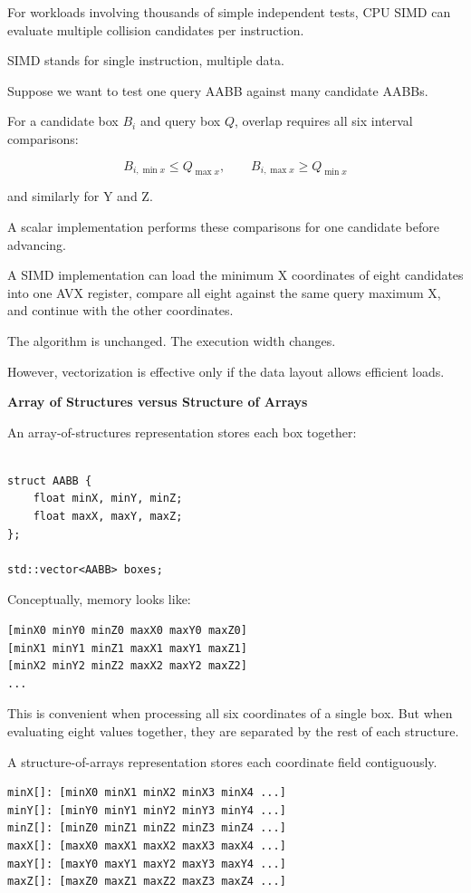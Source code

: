 For workloads involving thousands of simple independent tests, CPU SIMD can evaluate multiple collision candidates per instruction.

SIMD stands for single instruction, multiple data.

Suppose we want to test one query AABB against many candidate AABBs.

For a candidate box \(B_i\) and query box \(Q\), overlap requires all six interval comparisons:

\[
B_{i,\min x}\le Q_{\max x}, \qquad B_{i,\max x}\ge Q_{\min x}
\]

and similarly for Y and Z.

A scalar implementation performs these comparisons for one candidate before advancing.

A SIMD implementation can load the minimum X coordinates of eight candidates into one AVX register, compare all eight against the same query maximum X, and continue with the other coordinates.

The algorithm is unchanged. The execution width changes.

However, vectorization is effective only if the data layout allows efficient loads.

\textbf{Array of Structures versus Structure of Arrays}

An array-of-structures representation stores each box together:

\begin{verbatim}

struct AABB {
    float minX, minY, minZ;
    float maxX, maxY, maxZ;
};

std::vector<AABB> boxes;
\end{verbatim}

Conceptually, memory looks like:

\begin{verbatim}
[minX0 minY0 minZ0 maxX0 maxY0 maxZ0]
[minX1 minY1 minZ1 maxX1 maxY1 maxZ1]
[minX2 minY2 minZ2 maxX2 maxY2 maxZ2]
...
\end{verbatim}

This is convenient when processing all six coordinates of a single box. But when evaluating eight  values together, they are separated by the rest of each structure.

A structure-of-arrays representation stores each coordinate field contiguously.

\begin{verbatim}
minX[]: [minX0 minX1 minX2 minX3 minX4 ...]
minY[]: [minY0 minY1 minY2 minY3 minY4 ...]
minZ[]: [minZ0 minZ1 minZ2 minZ3 minZ4 ...]
maxX[]: [maxX0 maxX1 maxX2 maxX3 maxX4 ...]
maxY[]: [maxY0 maxY1 maxY2 maxY3 maxY4 ...]
maxZ[]: [maxZ0 maxZ1 maxZ2 maxZ3 maxZ4 ...]
\end{verbatim}


